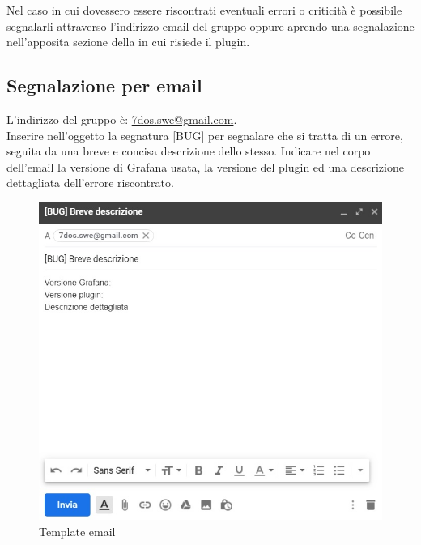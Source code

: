 Nel caso in cui dovessero essere riscontrati eventuali errori o criticità è possibile segnalarli attraverso l'indirizzo email del gruppo oppure aprendo una segnalazione nell'apposita sezione  della  in cui risiede il plugin.

\subsection{Segnalazione per email}
L'indirizzo del gruppo è: {\url{7dos.swe@gmail.com}}. \\
Inserire nell'oggetto la segnatura [BUG] per segnalare che si tratta di un errore, seguita da una breve e concisa descrizione dello stesso.
Indicare nel corpo dell'email la versione di Grafana usata, la versione del plugin ed una descrizione dettagliata dell'errore riscontrato.

\begin{figure} [H]
	\centering
	\includegraphics[scale=0.9]{Img/email.jpg} 
	\caption{Template email} \label{} 
\end{figure} 

